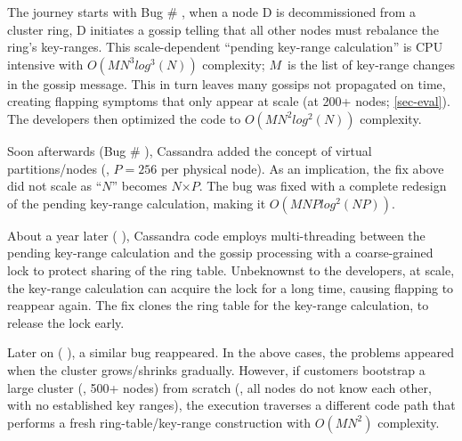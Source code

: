 The journey starts with Bug \# \cite{CA-Two}, when a node D is
decommissioned from a cluster ring, D initiates a gossip telling that all other
nodes must rebalance the ring's key-ranges.  This scale-dependent ``pending
key-range calculation'' is CPU intensive with
%
$O(MN^3log^3(N))$  %
%
complexity; $M$~is the list of key-range changes in the gossip message.  This
in turn leaves many gossips not propagated on time, creating flapping symptoms
that only appear at scale (at 200+ nodes; \sec\ref{sec-eval}). The developers
then optimized the code to
%
$O(MN^2log^2(N))$ complexity.



Soon afterwards (Bug \# \cite{CA-Tri}), Cassandra added the concept of
virtual partitions/nodes (\eg, $P$$=$$256$ per physical node).  As an
implication, the fix above did not scale as ``$N$'' becomes $N$$\times$$P$.
%
The bug was fixed with a complete redesign of the pending key-range
calculation, making it
$O(MNPlog^2(NP))$.

About a year later ( \cite{CA-Four}), Cassandra code employs
multi-threading between the pending key-range calculation and the gossip
processing with a coarse-grained lock to protect sharing of the ring
table.  Unbeknownst to the developers, at scale, the key-range calculation
can acquire the lock for a long time, causing flapping to reappear again.
The fix clones the ring table for the key-range calculation, to release the
lock early.



Later on ( \cite{CA-One}), a similar bug reappeared.  In the above
cases, the problems appeared when the cluster grows/shrinks gradually.
However, if customers bootstrap a large cluster (\eg, 500+ nodes) from
scratch (\ie, all nodes do not know each other, with no established
key ranges),
%
the execution traverses a different code path that
performs a fresh ring-table/key-range construction with
$O(MN^2)$ %
complexity.

%
%

